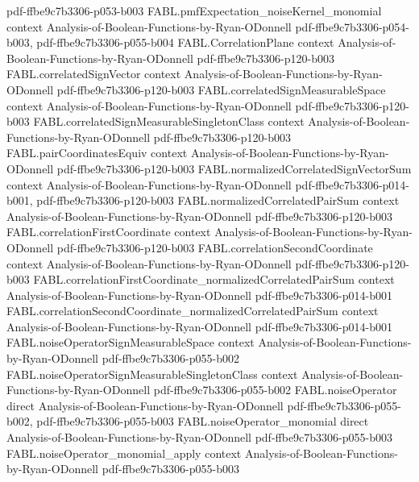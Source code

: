 \begin{theorem}
  {pdf-ffbe9c7b3306-p053-b003}
\proofstep
  {FABL.pmfExpectation_noiseKernel_monomial}
  {context}
  {Analysis-of-Boolean-Functions-by-Ryan-ODonnell}
  {pdf-ffbe9c7b3306-p054-b003,
    pdf-ffbe9c7b3306-p055-b004}
\proofstep
  {FABL.CorrelationPlane}
  {context}
  {Analysis-of-Boolean-Functions-by-Ryan-ODonnell}
  {pdf-ffbe9c7b3306-p120-b003}
\proofstep
  {FABL.correlatedSignVector}
  {context}
  {Analysis-of-Boolean-Functions-by-Ryan-ODonnell}
  {pdf-ffbe9c7b3306-p120-b003}
\proofstep
  {FABL.correlatedSignMeasurableSpace}
  {context}
  {Analysis-of-Boolean-Functions-by-Ryan-ODonnell}
  {pdf-ffbe9c7b3306-p120-b003}
\proofstep
  {FABL.correlatedSignMeasurableSingletonClass}
  {context}
  {Analysis-of-Boolean-Functions-by-Ryan-ODonnell}
  {pdf-ffbe9c7b3306-p120-b003}
\proofstep
  {FABL.pairCoordinatesEquiv}
  {context}
  {Analysis-of-Boolean-Functions-by-Ryan-ODonnell}
  {pdf-ffbe9c7b3306-p120-b003}
\proofstep
  {FABL.normalizedCorrelatedSignVectorSum}
  {context}
  {Analysis-of-Boolean-Functions-by-Ryan-ODonnell}
  {pdf-ffbe9c7b3306-p014-b001,
    pdf-ffbe9c7b3306-p120-b003}
\proofstep
  {FABL.normalizedCorrelatedPairSum}
  {context}
  {Analysis-of-Boolean-Functions-by-Ryan-ODonnell}
  {pdf-ffbe9c7b3306-p120-b003}
\proofstep
  {FABL.correlationFirstCoordinate}
  {context}
  {Analysis-of-Boolean-Functions-by-Ryan-ODonnell}
  {pdf-ffbe9c7b3306-p120-b003}
\proofstep
  {FABL.correlationSecondCoordinate}
  {context}
  {Analysis-of-Boolean-Functions-by-Ryan-ODonnell}
  {pdf-ffbe9c7b3306-p120-b003}
\proofstep
  {FABL.correlationFirstCoordinate_normalizedCorrelatedPairSum}
  {context}
  {Analysis-of-Boolean-Functions-by-Ryan-ODonnell}
  {pdf-ffbe9c7b3306-p014-b001}
\proofstep
  {FABL.correlationSecondCoordinate_normalizedCorrelatedPairSum}
  {context}
  {Analysis-of-Boolean-Functions-by-Ryan-ODonnell}
  {pdf-ffbe9c7b3306-p014-b001}
\proofstep
  {FABL.noiseOperatorSignMeasurableSpace}
  {context}
  {Analysis-of-Boolean-Functions-by-Ryan-ODonnell}
  {pdf-ffbe9c7b3306-p055-b002}
\proofstep
  {FABL.noiseOperatorSignMeasurableSingletonClass}
  {context}
  {Analysis-of-Boolean-Functions-by-Ryan-ODonnell}
  {pdf-ffbe9c7b3306-p055-b002}
\proofstep
  {FABL.noiseOperator}
  {direct}
  {Analysis-of-Boolean-Functions-by-Ryan-ODonnell}
  {pdf-ffbe9c7b3306-p055-b002,
    pdf-ffbe9c7b3306-p055-b003}
\proofstep
  {FABL.noiseOperator_monomial}
  {direct}
  {Analysis-of-Boolean-Functions-by-Ryan-ODonnell}
  {pdf-ffbe9c7b3306-p055-b003}
\proofstep
  {FABL.noiseOperator_monomial_apply}
  {context}
  {Analysis-of-Boolean-Functions-by-Ryan-ODonnell}
  {pdf-ffbe9c7b3306-p055-b003}
\proofstep

\end{theorem}
